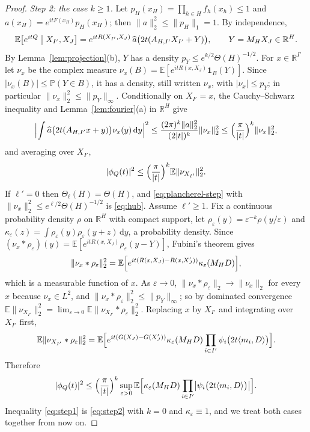\documentclass[11pt]{amsart}
\numberwithin{equation}{section}
\theoremstyle{definition}
\theoremstyle{remark}
\newcommand{\R}{\mathbb R}
\newcommand{\E}{\mathbb E}
\newcommand{\PP}{\mathbb P}
\newcommand{\1}{\mathbf 1}
\newcommand{\dd}{\,\mathrm d}
\newcommand{\norm}[1]{\lVert #1\rVert}
\newcommand{\abs}[1]{\lvert #1\rvert}
\begin{document}
\begin{proof}
\emph{Step 2: the case $k\ge1$.} Let $p_H(x_H)=\prod_{h\in H}f_h(x_h)\le1$ and $a(x_H)=e^{itF(x_H)}p_H(x_H)$; then $\norm a_2^2\le\norm{p_H}_1=1$. By independence,
\[
\E\bigl[e^{itQ}\bigm|X_{I'},X_J\bigr]=e^{itR(X_{I'},X_J)}\,\widehat a\bigl(2t(A_{H,I'}X_{I'}+Y)\bigr),\qquad Y=M_HX_J\in\R^H.
\]
By Lemma~\ref{lem:projection}(b), $Y$ has a density $p_Y\le e^{k/2}\Theta(H)^{-1/2}$. For $x\in\R^{I'}$ let $\nu_x$ be the complex measure $\nu_x(B)=\E[e^{itR(x,X_J)}\1_B(Y)]$. Since $\abs{\nu_x(B)}\le\PP(Y\in B)$, it has a density, still written $\nu_x$, with $\abs{\nu_x}\le p_Y$; in particular $\norm{\nu_x}_2^2\le\norm{p_Y}_\infty$. Conditionally on $X_{I'}=x$, the Cauchy--Schwarz inequality and Lemma~\ref{lem:fourier}(a) in $\R^H$ give
\[
\Bigl\lvert\int\widehat a\bigl(2t(A_{H,I'}x+y)\bigr)\nu_x(y)\dd y\Bigr\rvert^2\le\frac{(2\pi)^k\norm a_2^2}{(2\abs t)^k}\norm{\nu_x}_2^2\le\Bigl(\frac\pi{\abs t}\Bigr)^k\norm{\nu_x}_2^2 ,
\]
and averaging over $X_{I'}$,
\begin{equation}\label{eq:plancherel-step}
\abs{\phi_Q(t)}^2\le\Bigl(\frac\pi{\abs t}\Bigr)^k\E\norm{\nu_{X_{I'}}}_2^2 .
\end{equation}
If $\ell'=0$ then $\Theta_\ell(H)=\Theta(H)$, and \eqref{eq:plancherel-step} with $\norm{\nu_x}_2^2\le e^{\ell/2}\Theta(H)^{-1/2}$ is \eqref{eq:hub}. Assume $\ell'\ge1$. Fix a continuous probability density $\rho$ on $\R^H$ with compact support, let $\rho_\varepsilon(y)=\varepsilon^{-k}\rho(y/\varepsilon)$ and $\kappa_\varepsilon(z)=\int\rho_\varepsilon(y)\rho_\varepsilon(y+z)\dd y$, a probability density. Since $(\nu_x*\rho_\varepsilon)(y)=\E[e^{itR(x,X_J)}\rho_\varepsilon(y-Y)]$, Fubini's theorem gives
\[
\norm{\nu_x*\rho_\varepsilon}_2^2=\E\Bigl[e^{it(R(x,X_J)-R(x,X_J'))}\kappa_\varepsilon(M_HD)\Bigr],
\]
which is a measurable function of $x$. As $\varepsilon\to0$, $\norm{\nu_x*\rho_\varepsilon}_2\to\norm{\nu_x}_2$ for every $x$ because $\nu_x\in L^2$, and $\norm{\nu_x*\rho_\varepsilon}_2^2\le\norm{p_Y}_\infty$; so by dominated convergence $\E\norm{\nu_{X_{I'}}}_2^2=\lim_{\varepsilon\to0}\E\norm{\nu_{X_{I'}}*\rho_\varepsilon}_2^2$. Replacing $x$ by $X_{I'}$ and integrating over $X_{I'}$ first,
\[
\E\norm{\nu_{X_{I'}}*\rho_\varepsilon}_2^2=\E\Bigl[e^{it(G(X_J)-G(X_J'))}\kappa_\varepsilon(M_HD)\prod_{i\in I'}\psi_i\bigl(2t\langle m_i,D\rangle\bigr)\Bigr].
\]
Therefore
\begin{equation}\label{eq:step2}
\abs{\phi_Q(t)}^2\le\Bigl(\frac\pi{\abs t}\Bigr)^k\sup_{\varepsilon>0}\E\Bigl[\kappa_\varepsilon(M_HD)\prod_{i\in I'}\bigl\lvert\psi_i\bigl(2t\langle m_i,D\rangle\bigr)\bigr\rvert\Bigr].
\end{equation}
Inequality \eqref{eq:step1} is \eqref{eq:step2} with $k=0$ and $\kappa_\varepsilon\equiv1$, and we treat both cases together from now on.


\end{proof}
\end{document}

